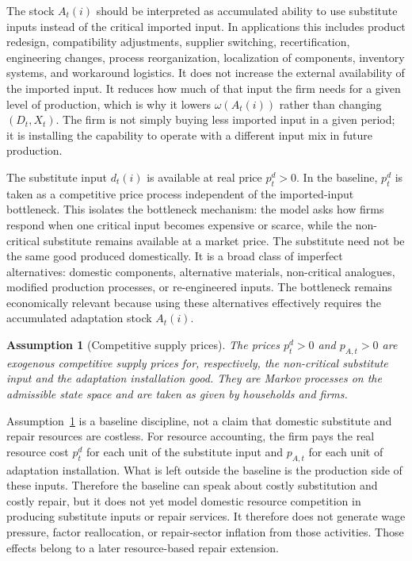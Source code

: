 ﻿\documentclass[12pt]{article}
\newtheorem{assumption}{Assumption}
\theoremstyle{remark}
\begin{document}
The stock $A_t(i)$ should be interpreted as accumulated ability to use substitute inputs instead
of the critical imported input. In applications this includes product redesign, compatibility
adjustments, supplier switching, recertification, engineering changes, process reorganization,
localization of components, inventory systems, and workaround logistics. It does not increase the
external availability of the imported input. It reduces how much of that input the firm needs for a
given level of production, which is why it lowers $\omega(A_t(i))$ rather than changing
$(D_t,X_t)$. The firm is not simply buying less imported input in a given period; it is installing
the capability to operate with a different input mix in future production.

The substitute input $d_t(i)$ is available at real price $p_t^d>0$. In the baseline, $p_t^d$ is
taken as a competitive price process independent of the imported-input bottleneck. This isolates
the bottleneck mechanism: the model asks how firms respond when one critical input becomes
expensive or scarce, while the non-critical substitute remains available at a market price.
The substitute need not be the same good produced domestically. It is a broad class of imperfect
alternatives: domestic components, alternative materials, non-critical analogues, modified
production processes, or re-engineered inputs. The bottleneck remains economically relevant because
using these alternatives effectively requires the accumulated adaptation stock $A_t(i)$.

\begin{assumption}[Competitive supply prices]\label{ass:competitive_supply_prices}
The prices $p_t^d>0$ and $p_{A,t}>0$ are exogenous competitive supply prices for, respectively,
the non-critical substitute input and the adaptation installation good. They are Markov processes
on the admissible state space and are taken as given by households and firms.
\end{assumption}

Assumption~\ref{ass:competitive_supply_prices} is a baseline discipline, not a claim that domestic
substitute and repair resources are costless. For resource accounting, the firm pays the real
resource cost $p_t^d$ for each unit of the substitute input and $p_{A,t}$ for each unit of
adaptation installation. What is left outside the baseline is the production side of these inputs.
Therefore the baseline can speak about costly substitution and costly repair, but it does not yet
model domestic resource competition in producing substitute inputs or repair services. It therefore
does not generate wage pressure, factor reallocation, or repair-sector inflation from those
activities. Those effects belong to a later resource-based repair extension.
\end{document}
